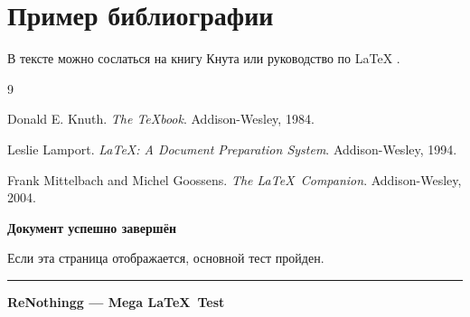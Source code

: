 \documentclass[12pt,a4paper]{article}
\theoremstyle{definition}
\theoremstyle{remark}
\begin{document}

\section{Пример библиографии}

В тексте можно сослаться на книгу Кнута \cite{knuth1984}
или руководство по LaTeX \cite{lamport1994}.

\begin{thebibliography}{9}

Donald E. Knuth.
\textit{The TeXbook}.
Addison-Wesley, 1984.

Leslie Lamport.
\textit{\LaTeX: A Document Preparation System}.
Addison-Wesley, 1994.

Frank Mittelbach and Michel Goossens.
\textit{The \LaTeX\ Companion}.
Addison-Wesley, 2004.

\end{thebibliography}


\newpage

\begin{center}

    \vspace*{4cm}

    {\Huge\bfseries Документ успешно завершён}

    \vspace{1cm}


    \vspace{1cm}

    {\Large Если эта страница отображается, основной тест пройден.}

    \vspace{1cm}

    \rule{0.7\textwidth}{0.5pt}

    \vspace{0.5cm}

    \textbf{ReNothingg --- Mega \LaTeX\ Test}

\end{center}
\end{document}
